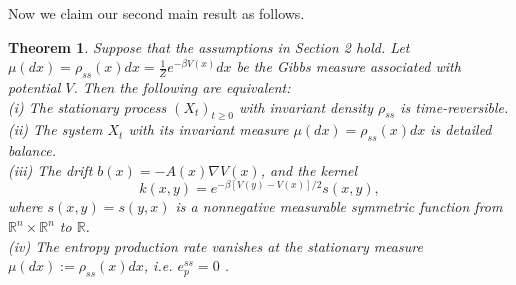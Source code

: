 \documentclass[10pt]{article}
\newtheorem{thm}{Theorem}[section]
\theoremstyle{definition}
\theoremstyle{remark}
\numberwithin{equation}{section}
\begin{document}
Now we claim our second main result as follows.

\begin{thm}\label{TSeq}
Suppose that the assumptions in Section 2 hold.
Let $\mu(dx) = \rho_{ss}(x)dx = \frac{1}{Z} e^{-\beta V(x)}dx$ be the Gibbs measure associated with potential $V$.
Then the following are equivalent: \\
(i) The stationary process $(X_t)_{t\geq 0}$ with invariant density $\rho_{ss}$ is time-reversible.\\
(ii) The system $X_t$ with its invariant measure $\mu(dx)=\rho_{ss}(x)dx$ is detailed balance.\\
(iii) The drift $b(x) = -A(x)\nabla V(x)$, and the kernel
\begin{equation*}
    k(x,y) = e^{-\beta[V(y)-V(x)]/2} s(x,y),
\end{equation*}
where $s(x,y) = s(y,x)$ is a nonnegative measurable symmetric function from $\mathbb{R}^n \times \mathbb{R}^n$ to $\mathbb{R}$.\\
(iv) The entropy production rate vanishes at the stationary measure $\mu(dx) :=\rho_{ss}(x)dx$, i.e. $e^{ss}_{p} = 0$ .
\end{thm}
\end{document}
